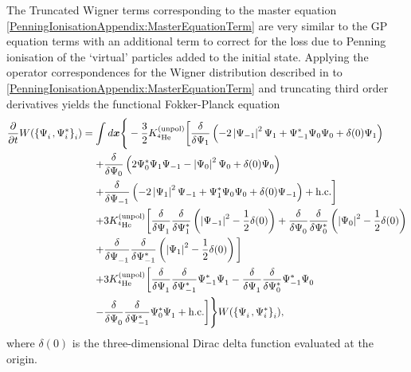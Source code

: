 The Truncated Wigner terms corresponding to the master equation \eqref{PenningIonisationAppendix:MasterEquationTerm} are very similar to the GP equation terms with an additional term to correct for the loss due to Penning ionisation of the `virtual' particles added to the initial state. Applying the operator correspondences for the Wigner distribution described in  to \eqref{PenningIonisationAppendix:MasterEquationTerm} and truncating third order derivatives yields the functional Fokker-Planck equation
\begin{align}
    \begin{split}
    \frac{\partial}{\partial t} W(\left\{ \Psi_i^{\phantom{*}}, \Psi_i^*\right\}_i) &= \int d \bm{x} \Bigg\{ -\frac{3}{2}\Kunpol\bigg[\frac{\delta}{\delta \Psi_1}\left(-2 \abs{\Psi_{-1}}^2\Psi_1 +\Psi_{-1}^*\Psi_0\Psi_0  + \delta(0) \Psi_1\right)\\
    &\relphantom{=} +\frac{\delta}{\delta \Psi_0}\left(2 \Psi_0^* \Psi_1 \Psi_{-1}  - \abs{\Psi_0}^2 \Psi_0 + \delta(0) \Psi_0\right)\\
    &\relphantom{=} +\frac{\delta}{\delta \Psi_{-1}}\left(- 2 \abs{\Psi_1}^2 \Psi_{-1} + \Psi_1^* \Psi_0 \Psi_0  + \delta(0) \Psi_{-1}\right) + \text{h.c.} \bigg]\\
    &\relphantom{=} + 3 \Kunpol \bigg[\frac{\delta}{\delta \Psi_1^{\phantom{*}}} \frac{\delta}{\delta \Psi_1^*}\left(\abs{\Psi_{-1}}^2 - \frac{1}{2} \delta(0)\right) + \frac{\delta}{\delta \Psi_0^{\phantom{*}}} \frac{\delta}{\delta \Psi_0^*}\left(\abs{\Psi_0}^2 - \frac{1}{2} \delta(0)\right) \\
    &\relphantom{=} + \frac{\delta}{\delta \Psi_{-1}^{\phantom{*}}} \frac{\delta}{\delta \Psi_{-1}^*} \left(\abs{\Psi_1}^2 - \frac{1}{2}\delta(0)\right)\bigg] \\
    &\relphantom{=} +3 \Kunpol\bigg[\frac{\delta}{\delta \Psi_1^{\phantom{*}}}\frac{\delta}{\delta \Psi_{-1}^*}\Psi_{-1}^*\Psi_{1}^{\phantom{*}}  - \frac{\delta}{\delta \Psi_{1}^{\phantom{*}}}\frac{\delta}{\delta \Psi_0^*}\Psi_{-1}^* \Psi_0^{\phantom{*}} \\
    &\relphantom{=} - \frac{\delta}{\delta \Psi_0^{\phantom{*}}}\frac{\delta}{\delta \Psi_{-1}^*} \Psi_0^* \Psi_1^{\phantom{*}} + \text{h.c.} \bigg]\Bigg\}W(\left\{\Psi_i^{\phantom{*}}, \Psi_i^* \right\}_i),
    \end{split}
    \label{PenningIonisationAppendix:FunctionalFokkerPlanckEquation}
\end{align}
where $\delta(0)$ is the three-dimensional Dirac delta function evaluated at the origin.

